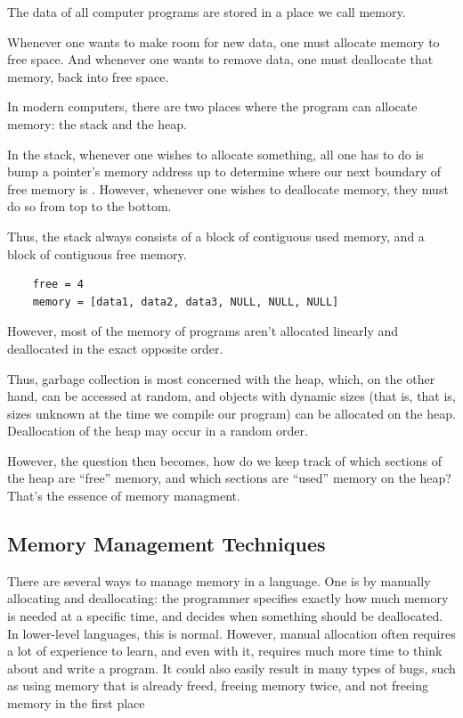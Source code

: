 \documentclass[index]{subfiles}
\begin{document}

The data of all computer programs are stored in a place we call memory.

Whenever one wants to make room for new data, one must allocate memory to free space. And whenever one wants to remove data, one must deallocate that memory, back into free space.

In modern computers, there are two places where the program can allocate memory: the stack and the heap.

In the stack, whenever one wishes to allocate something, all one has to do is bump a pointer's memory address up to determine where our next boundary of free memory is \cite{the_rust_programming_language}. However, whenever one wishes to deallocate memory, they must do so from top to the bottom.

Thus, the stack always consists of a block of contiguous used memory, and a block of contiguous free memory.

\begin{verbatim}
    free = 4
    memory = [data1, data2, data3, NULL, NULL, NULL]
\end{verbatim}

However, most of the memory of programs aren't allocated linearly and deallocated in the exact opposite order.

Thus, garbage collection is most concerned with the heap, which, on the other hand, can be accessed at random, and objects with dynamic sizes (that is, that is, sizes unknown at the time we compile our program) can be allocated on the heap. Deallocation of the heap may occur in a random order.

However, the question then becomes, how do we keep track of which sections of the heap are ``free'' memory, and which sections are ``used'' memory on the heap? That's the essence of memory managment.

\subsection{Memory Management Techniques}

There are several ways to manage memory in a language. One is by manually allocating and deallocating: the programmer specifies exactly how much memory is needed at a specific time, and decides when something should be deallocated. In lower-level languages, this is normal. However, manual allocation often requires a lot of experience to learn, and even with it, requires much more time to think about and write a program. It could also easily result in many types of bugs, such as using memory that is already freed, freeing memory twice, and not freeing memory in the first place \cites{garbage_collection_overview_uw}[Chapter~1]{gc_handbook}
\end{document}
